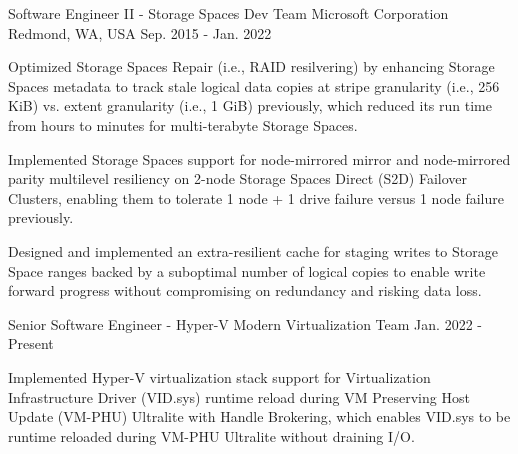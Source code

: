 

\begin{cventries}

  \cventrytwopositions
  {Software Engineer II - Storage Spaces Dev Team} %
  {Microsoft Corporation} %
  {Redmond, WA, USA} %
  {Sep. 2015 - Jan. 2022} %
  {
    \begin{cvitems} %
      \item {
        Optimized Storage Spaces Repair (i.e., RAID resilvering) by enhancing Storage
        Spaces metadata to track stale logical data copies at stripe granularity
        (i.e., 256 KiB) vs. extent granularity (i.e., 1 GiB) previously, which
        reduced its run time from hours to minutes for multi-terabyte Storage Spaces.
      }
      \item {
        Implemented Storage Spaces support for node-mirrored mirror and node-mirrored
        parity multilevel resiliency on 2-node Storage Spaces Direct (S2D) Failover
        Clusters, enabling them to tolerate 1 node + 1 drive failure versus 1 node
        failure previously.
      }
      \item {
        Designed and implemented an extra-resilient cache for staging writes to
        Storage Space ranges backed by a suboptimal number of logical copies to
        enable write forward progress without compromising on redundancy and risking
        data loss.
      }
    \end{cvitems}
  }
  {Senior Software Engineer - Hyper-V Modern Virtualization Team} %
  {Jan. 2022 - Present} %
  {
    \begin{cvitems} %
      \item {
        Implemented Hyper-V virtualization stack support for Virtualization
        Infrastructure Driver (VID.sys) runtime reload during VM Preserving Host
        Update (VM-PHU) Ultralite with Handle Brokering, which enables VID.sys to be
        runtime reloaded during VM-PHU Ultralite without draining I/O.
      }
      \item {
}
\end{cvitems}}
\end{cventries}
